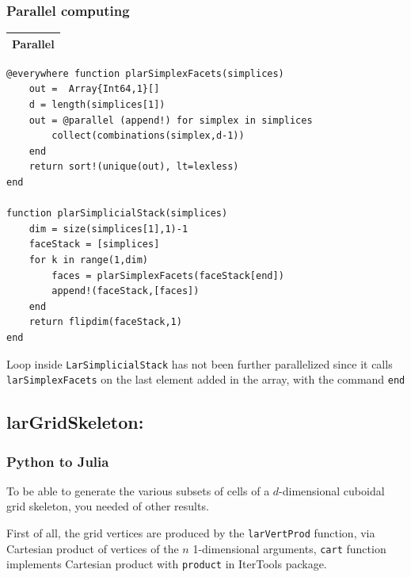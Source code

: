 \documentclass{article}
\begin{document}
\subsubsection{Parallel computing}
\vspace{1ex}
\begin{flushleft} \small
\begin{center}
\begin{tabular}{|p{16cm}|}
\hline
\cellcolor[gray]{.9}Parallel\\
\hline
\end{tabular}
\end{center}
\vspace{2ex}
\begin{list}{}{} \item
   \begin{Verbatim}[tabsize=4]
@everywhere function plarSimplexFacets(simplices)
	out =  Array{Int64,1}[]
	d = length(simplices[1])
	out = @parallel (append!) for simplex in simplices
		collect(combinations(simplex,d-1))
	end
	return sort!(unique(out), lt=lexless)
end

function plarSimplicialStack(simplices)
    dim = size(simplices[1],1)-1   
    faceStack = [simplices]
    for k in range(1,dim)
        faces = plarSimplexFacets(faceStack[end])
        append!(faceStack,[faces])
    end
    return flipdim(faceStack,1)
end       
   \end{Verbatim}
\end{list}
\end{flushleft}
\vspace{2ex}
Loop inside \texttt{LarSimplicialStack} has not been further parallelized since it calls  \texttt{larSimplexFacets} on the last element added in the array, with the command \texttt{end}
\vspace{2ex}
\subsection{larGridSkeleton:}

\subsubsection{Python to Julia}
To be able to generate the various subsets of cells of a $d$-dimensional cuboidal grid skeleton, you needed of other results. 

First of all, the grid vertices are produced by the \texttt{larVertProd} function, via Cartesian product of
vertices of the $n$ 1-dimensional arguments, \texttt{cart} function implements Cartesian product with \texttt{product} in IterTools package.
\end{document}
